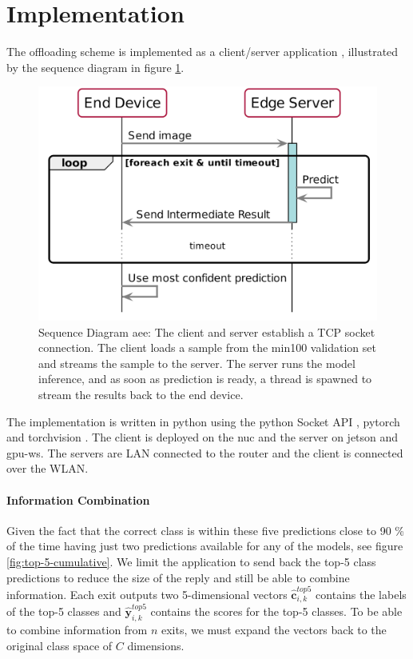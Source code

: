 \section{Implementation} \label{sec:edge-implementation}

The offloading scheme is implemented as a client/server application \cite{sommerville_software_2015}, illustrated by the sequence diagram in figure \ref{fig:sequence-diagram}. 

\begin{figure}
	\captionsetup[subfigure]{justification=centering}
	\centering
	\includegraphics[width=.7\linewidth]{figures/models/sequence_diagram}
	\caption[Sequence Diagram \acrshort{aee}]{Sequence Diagram \acrshort{aee}: The client and server establish a TCP socket connection. The client loads a sample from the \gls{min100} validation set and streams the sample to the server. The server runs the model inference, and as soon as prediction is ready, a thread is spawned to stream the results back to the end device.}
	\label{fig:sequence-diagram}
\end{figure}

The implementation is written in \gls{python} using the \gls{python} Socket API \cite{noauthor_socket_nodate}, \gls{pytorch} \cite{paszke_automatic_2017} and \gls{torchvision} \cite{marcel_torchvision_2010}. The client is deployed on the \gls{nuc} and the server on \gls{jetson} and \gls{gpu-ws}. The servers are LAN connected to the router and the client is connected over the WLAN.

\paragraph{Information Combination}

Given the fact that the correct class is within these five predictions close to 90 \% of the time having just two predictions available for any of the models, see figure \ref{fig:top-5-cumulative}. We limit the application to send back the top-5 class predictions to reduce the size of the reply and still be able to combine information. Each exit outputs two 5-dimensional vectors $\bm{\hat{c}}_{i,k}^{top5}$ contains the labels of the top-5 classes and $ \bm{\hat{y}}_{i,k}^{top5}$ contains the scores for the top-5 classes. To be able to combine information from $ n $ exits, we must expand the vectors back to the original class space of $ C $ dimensions.

